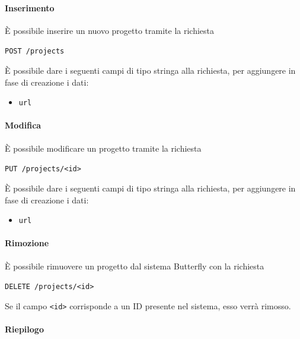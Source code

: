 \paragraph{Inserimento}
È possibile inserire un nuovo progetto tramite la richiesta
    \begin{center}
        \texttt{POST /projects}
    \end{center}

È possibile dare i seguenti campi di tipo stringa alla richiesta, per aggiungere in fase di creazione
i dati:
\begin{itemize}[noitemsep]
    \item \texttt{url}
\end{itemize}


\paragraph{Modifica}

È possibile modificare un progetto tramite la richiesta
\begin{center}
    \texttt{PUT /projects/<id>}
\end{center}
È possibile dare i seguenti campi di tipo stringa alla richiesta, per aggiungere in fase di creazione
i dati:
\begin{itemize}[noitemsep]
    \item \texttt{url}
\end{itemize}


\paragraph{Rimozione}

È possibile rimuovere un progetto dal sistema Butterfly con la richiesta
\begin{center}
    \texttt{DELETE /projects/<id>}
\end{center}

Se il campo \texttt{<id>} corrisponde a un ID presente nel sistema, esso verrà rimosso.


\paragraph{Riepilogo}

